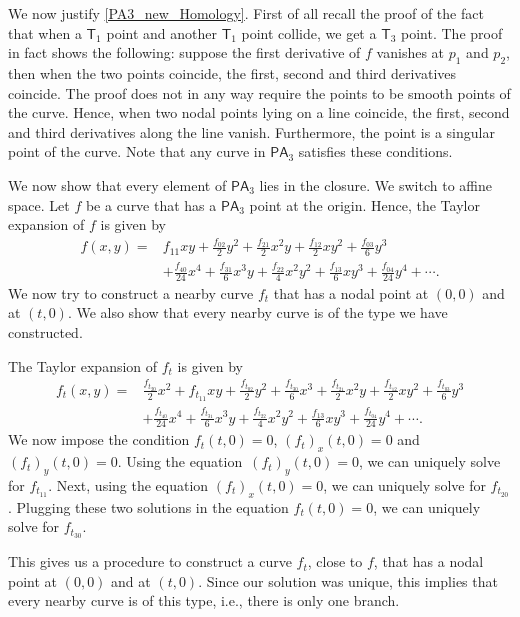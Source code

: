 \documentclass[pdftex]{sigma}
\numberwithin{equation}{section}
\begin{document}
We now justify \eqref{PA3_new_Homology}.
First of all recall the proof of the fact that when a
$\mathsf{T}_1$ point and another $\mathsf{T}_1$ point collide, we get a $\mathsf{T}_3$ point.
The proof in fact shows the following: suppose the first derivative of $f$ vanishes at $p_1$
and $p_2$, then when the two points coincide, the first, second and third derivatives coincide.
The proof does not in any way require the points to be smooth points of the curve. Hence, when two
nodal points lying on a line coincide, the first, second and third derivatives along the line vanish.
Furthermore, the point is a singular point of the curve. Note that any curve in $\mathsf{PA}_3$ satisfies these
conditions.

We now show that every element of $\mathsf{PA}_3$ lies in the closure. We switch to affine space.
Let $f$ be a curve that has a $\mathsf{PA}_3$ point at the origin. Hence, the Taylor expansion of $f$ is given by
\begin{align*}
f(x,y) ={} &f_{11} xy + \frac{f_{02}}{2} y^2 + \frac{f_{21}}{2} x^2 y + \frac{f_{12}}{2} x y^2 + \frac{f_{03}}{6} y^3 \\
& +\frac{f_{40}}{24}x^4+ \frac{f_{31}}{6} x^3 y + \frac{f_{22}}{4} x^2 y^2 + \frac{f_{13}}{6} x y^3 +
\frac{f_{04}}{24} y^4 + \cdots.
\end{align*}
We now try to construct a nearby curve $f_t$ that has a nodal point at $(0, 0)$ and at $(t, 0)$. We also show that
every nearby curve is of the type we have constructed.

The Taylor expansion of $f_t$ is given by
\begin{align*}
f_t(x,y) ={}& \frac{f_{t_{20}}}{2} x^2 + f_{t_{11}} xy + \frac{f_{t_{02}}}{2} y^2 +
\frac{f_{t_{30}}}{6} x^3 + \frac{f_{t_{21}}}{2} x^2 y + \frac{f_{t_{12}}}{2} x y^2 + \frac{f_{t_{03}}}{6} y^3 \\
& + \frac{f_{t_{40}}}{24} x^4 +\frac{f_{t_{31}}}{6} x^3 y + \frac{f_{t_{22}}}{4} x^2 y^2 + \frac{f_{13}}{6} x y^3 +
\frac{f_{t_{04}}}{24} y^4 +
\cdots.
\end{align*}
We now impose the condition $f_t(t, 0) = 0$, $(f_{t})_x(t, 0) = 0$ and $(f_{t})_y(t, 0) = 0$.
Using the equation~${(f_{t})_y(t, 0) = 0}$, we can uniquely solve for $f_{t_{11}}$.
Next, using the equation $(f_{t})_x(t, 0) = 0$, we can uniquely solve for $f_{t_{20}}$.
Plugging these two solutions in the equation
$f_t(t, 0) = 0$, we can uniquely solve for $f_{t_{30}}$.

This gives us a procedure to construct a curve $f_t$, close to $f$,
that has a nodal point at $(0, 0)$ and at $(t, 0)$. Since our solution was unique, this implies that every
nearby curve is of this type, i.e., there is only one branch.
\end{document}
